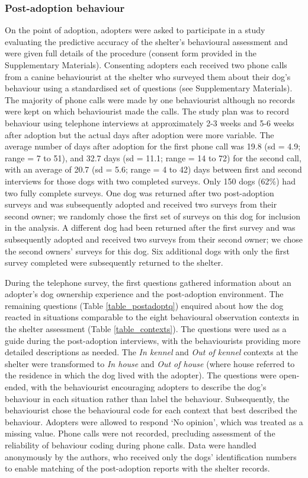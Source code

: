 \documentclass[fleqn,10pt]{wlscirep}
\begin{document}
\subsubsection*{Post-adoption behaviour}
On the point of adoption, adopters were asked to participate in a study evaluating the predictive accuracy of the shelter's behavioural assessment and were given full details of the procedure (consent form provided in the Supplementary Materials). Consenting adopters each received two phone calls from a canine behaviourist at the shelter who surveyed them about their dog's behaviour using a standardised set of questions (see Supplementary Materials). The majority of phone calls were made by one behaviourist although no records were kept on which behaviourist made the calls. The study plan was to record behaviour using telephone interviews at approximately 2-3 weeks and 5-6 weeks after adoption but the actual days after adoption were more variable. The average number of days after adoption for the first phone call was 19.8 (sd = 4.9; range = 7 to 51), and 32.7 days (sd = 11.1; range = 14 to 72) for the second call, with an average of 20.7 (sd = 5.6; range = 4 to 42) days between first and second interviews for those dogs with two completed surveys. Only 150 dogs (62\%) had two fully complete surveys. One dog was returned after two post-adoption surveys and was subsequently adopted and received two surveys from their second owner; we randomly chose the first set of surveys on this dog for inclusion in the analysis. A different dog had been returned after the first survey and was subsequently adopted and received two surveys from their second owner; we chose the second owners' surveys for this dog. Six additional dogs with only the first survey completed were subsequently returned to the shelter.

During the telephone survey, the first questions gathered information about an adopter's dog ownership experience and the post-adoption environment. The remaining questions (Table \ref{table_postadoptq}) enquired about how the dog reacted in situations comparable to the eight behavioural observation contexts in the shelter assessment (Table \ref{table_contexts}). The questions were used as a guide during the post-adoption interviews, with the behaviourists providing more detailed descriptions as needed. The \textit{In kennel} and \textit{Out of kennel} contexts at the shelter were transformed to \textit{In house} and \textit{Out of house} (where house referred to the residence in which the dog lived with the adopter). The questions were open-ended, with the behaviourist encouraging adopters to describe the dog's behaviour in each situation rather than label the behaviour. Subsequently, the behaviourist chose the behavioural code for each context that best described the behaviour. Adopters were allowed to respond `No opinion', which was treated as a missing value. Phone calls were not recorded, precluding assessment of the reliability of behaviour coding during phone calls. Data were handled anonymously by the authors, who received only the dogs' identification numbers to enable matching of the post-adoption reports with the shelter records.
\end{document}
